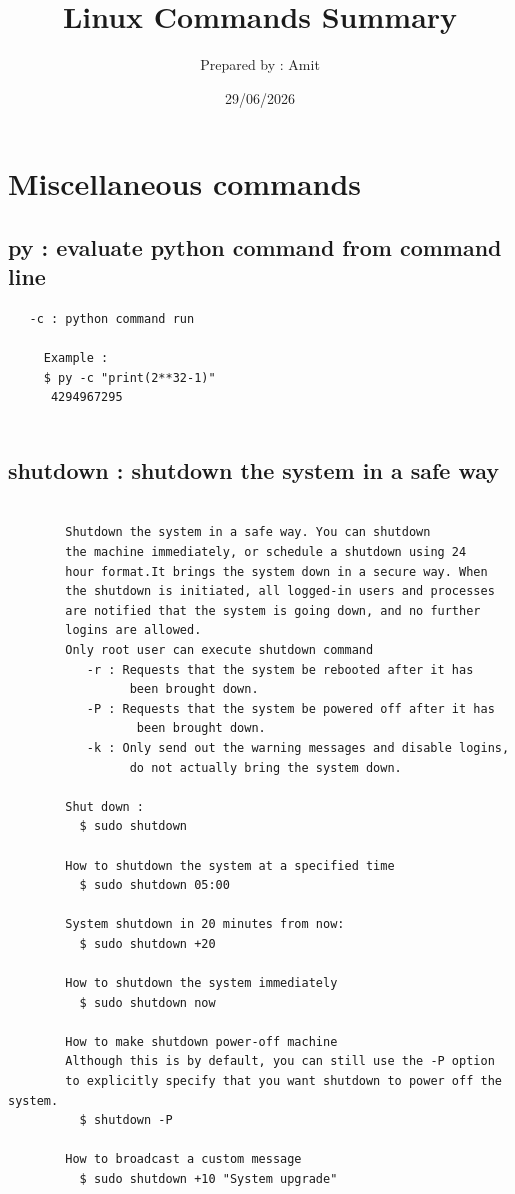 \documentclass[a4paper,12pt]{article}
\title{\bigskip\bigskip\bigskip\bigskip\bigskip\bigskip\bigskip\bigskip\bigskip\bigskip\bigskip\bigskip\centering\Large Linux Commands Summary }
\author{Prepared by : Amit}
\date{29/06/2026}
\begin{document}
\maketitle
\pagebreak


\setcounter{tocdepth}{10}

\tableofcontents
\pagebreak

\section{Miscellaneous commands}

\subsection{py : evaluate python command from command line}
\begin{verbatim}
   -c : python command run
   
     Example : 
     $ py -c "print(2**32-1)"
      4294967295
 
\end{verbatim}


\subsection{shutdown : shutdown the system in a safe way}
\begin{verbatim}

        Shutdown the system in a safe way. You can shutdown
        the machine immediately, or schedule a shutdown using 24
        hour format.It brings the system down in a secure way. When
        the shutdown is initiated, all logged-in users and processes
        are notified that the system is going down, and no further
        logins are allowed.
        Only root user can execute shutdown command
           -r : Requests that the system be rebooted after it has 
                 been brought down.
           -P : Requests that the system be powered off after it has 
                  been brought down.
           -k : Only send out the warning messages and disable logins, 
                 do not actually bring the system down.

        Shut down :
          $ sudo shutdown
        
        How to shutdown the system at a specified time
          $ sudo shutdown 05:00

        System shutdown in 20 minutes from now:
          $ sudo shutdown +20

        How to shutdown the system immediately
          $ sudo shutdown now

        How to make shutdown power-off machine
        Although this is by default, you can still use the -P option
        to explicitly specify that you want shutdown to power off the system.
          $ shutdown -P

        How to broadcast a custom message
          $ sudo shutdown +10 "System upgrade"

\end{verbatim}
\end{document}
